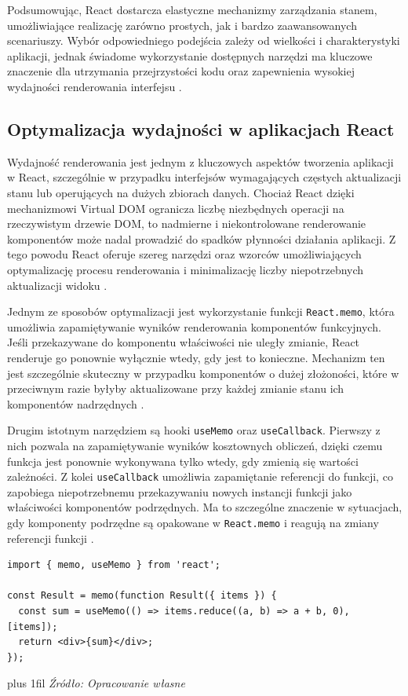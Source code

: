 \documentclass[12pt,openright,twoside]{report}
\newcommand{\source}[1]{{\par\vspace{5pt}\noindent\leftskip=0pt \rightskip=0pt \parfillskip=0pt plus 1fil \footnotesize\textit{Źródło: #1}\par}}
\begin{document}
Podsumowując, React dostarcza elastyczne mechanizmy zarządzania stanem, umożliwiające realizację zarówno prostych, jak i bardzo zaawansowanych scenariuszy. Wybór odpowiedniego podejścia zależy od wielkości i charakterystyki aplikacji, jednak świadome wykorzystanie dostępnych narzędzi ma kluczowe znaczenie dla utrzymania przejrzystości kodu oraz zapewnienia wysokiej wydajności renderowania interfejsu \cite{React_Up_Running}.

\subsection{Optymalizacja wydajności w aplikacjach React}
Wydajność renderowania jest jednym z kluczowych aspektów tworzenia aplikacji w React, szczególnie w przypadku interfejsów wymagających częstych aktualizacji stanu lub operujących na dużych zbiorach danych. Chociaż React dzięki mechanizmowi Virtual DOM ogranicza liczbę niezbędnych operacji na rzeczywistym drzewie DOM, to nadmierne i niekontrolowane renderowanie komponentów może nadal prowadzić do spadków płynności działania aplikacji. Z tego powodu React oferuje szereg narzędzi oraz wzorców umożliwiających optymalizację procesu renderowania i minimalizację liczby niepotrzebnych aktualizacji widoku \cite{High_Perf_JS}.

Jednym ze sposobów optymalizacji jest wykorzystanie funkcji \texttt{React.memo}, która umożliwia zapamiętywanie wyników renderowania komponentów funkcyjnych. Jeśli przekazywane do komponentu właściwości nie uległy zmianie, React renderuje go ponownie wyłącznie wtedy, gdy jest to konieczne. Mechanizm ten jest szczególnie skuteczny w przypadku komponentów o dużej złożoności, które w przeciwnym razie byłyby aktualizowane przy każdej zmianie stanu ich komponentów nadrzędnych \cite{Practical_Modern_JS}.

Drugim istotnym narzędziem są hooki \texttt{useMemo} oraz \texttt{useCallback}. Pierwszy z nich pozwala na zapamiętywanie wyników kosztownych obliczeń, dzięki czemu funkcja jest ponownie wykonywana tylko wtedy, gdy zmienią się wartości zależności. Z kolei \texttt{useCallback} umożliwia zapamiętanie referencji do funkcji, co zapobiega niepotrzebnemu przekazywaniu nowych instancji funkcji jako właściwości komponentów podrzędnych. Ma to szczególne znaczenie w sytuacjach, gdy komponenty podrzędne są opakowane w \texttt{React.memo} i reagują na zmiany referencji funkcji \cite{Learning_React_Third}.

\begin{lstlisting}[language=tsx, caption={Przykład optymalizacji renderowania komponentu przy użyciu \texttt{useMemo} oraz \texttt{React.memo}.}, label={lst:react-memo}]
import { memo, useMemo } from 'react';

const Result = memo(function Result({ items }) {
  const sum = useMemo(() => items.reduce((a, b) => a + b, 0), [items]);
  return <div>{sum}</div>;
});
\end{lstlisting}
\source{Opracowanie własne}
\end{document}
